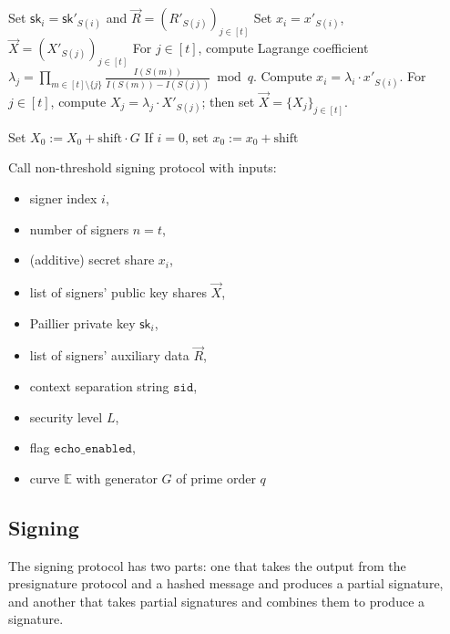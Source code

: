 \documentclass[11pt]{article}
\newcommand{\sid}{\ensuremath{\mathtt{sid}}}
\newcommand{\var}[1]{\ensuremath{\mathtt{#1}}}
\newcommand{\sk}{\textsf{sk}}
\newcommand{\E}{\mathbb{E}}
\newcommand{\?}[1]{\stackrel{?}{#1}}
\begin{document}
\begin{description}
\begin{algorithmic}[1]
        \State Set $\sk_i = \sk'_{S(i)}$ and $\vec R = (R'_{S(j)})_{j \in [t]}$
            \State Set $x_{i} = x'_{S(i)}$, $\vec X = (X'_{S(j)})_{j \in [t]}$
        \EndIf
            \State For $j \in [t]$, compute Lagrange coefficient $\lambda_j = \prod\limits_{m \in [t]\setminus\{j\}} \frac{I(S(m))}{I(S(m)) - I(S(j))} \bmod{q}$.
            \State Compute $x_{i} = \lambda_i \cdot x'_{S(i)}$.
            \State For $j \in [t]$, compute $X_j= \lambda_j \cdot X'_{S(j)}$; then set $\vec X = \{X_j\}_{j \in [t]}$.
        \EndIf

        \If{$\var{shift} \ne 0$} 
            \State Set $X_0 := X_0 + \text{shift} \cdot G$
            \State If $i = 0$, set $x_0 := x_0 + \text{shift}$
        \EndIf

        \State Call non-threshold signing protocol with inputs:
        \begin{itemize}[noitemsep,topsep=0pt]
        \item signer index $i$,
        \item number of signers $n = t$,
        \item (additive) secret share $x_i$,
        \item list of signers' public key shares $\vec X$,
        \item Paillier private key $\sk_i$,
        \item list of signers' auxiliary data $\vec R$,
        \item context separation string $\sid$,
        \item security level $L$,
        \item flag $\var{echo\_enabled}$,
        \item curve $\E$ with generator $G$ of prime order $q$
        \end{itemize}
    \end{algorithmic}

\end{description}


\subsection{Signing}
\label{sec:signing}
The signing protocol has two parts: one that takes the output from the presignature protocol and a hashed message and produces a partial signature, and another that takes partial signatures and combines them to produce a signature. 
\end{document}
